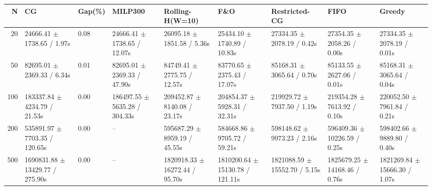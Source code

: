 \begin{tabular}{rllllllll}
\toprule
N & CG & Gap(\%) & MILP300 & Rolling-H(W=10) & F\&O & Restricted-CG & FIFO & Greedy \\
\midrule
20 & 24666.41 $\pm$ 1738.65 / 1.97s & 0.08 & 24666.41 $\pm$ 1738.65 / 12.07s & 26095.18 $\pm$ 1851.58 / 5.36s & 25434.10 $\pm$ 1740.89 / 10.83s & 27334.35 $\pm$ 2078.19 / 0.42s & 27354.35 $\pm$ 2058.26 / 0.00s & 27334.35 $\pm$ 2078.19 / 0.01s \\
50 & 82695.01 $\pm$ 2369.33 / 6.34s & 0.01 & 82695.01 $\pm$ 2369.33 / 47.90s & 84749.41 $\pm$ 2775.75 / 12.57s & 83770.65 $\pm$ 2375.43 / 17.07s & 85168.31 $\pm$ 3065.64 / 0.70s & 85133.55 $\pm$ 2627.06 / 0.01s & 85168.31 $\pm$ 3065.64 / 0.04s \\
100 & 183337.84 $\pm$ 4234.79 / 21.53s & 0.00 & 186497.55 $\pm$ 5635.28 / 304.33s & 209452.87 $\pm$ 8140.08 / 23.17s & 204854.37 $\pm$ 5928.31 / 32.31s & 219929.72 $\pm$ 7937.50 / 1.19s & 219354.28 $\pm$ 7613.92 / 0.10s & 220052.50 $\pm$ 7961.84 / 0.21s \\
200 & 535891.97 $\pm$ 7703.35 / 120.65s & 0.00 & -- & 595687.29 $\pm$ 8959.19 / 45.55s & 584668.86 $\pm$ 9705.72 / 59.21s & 598148.62 $\pm$ 9973.23 / 2.16s & 596409.36 $\pm$ 10226.59 / 0.25s & 598402.66 $\pm$ 9889.80 / 0.40s \\
500 & 1690831.88 $\pm$ 13429.77 / 275.90s & 0.00 & -- & 1820918.33 $\pm$ 16272.44 / 95.70s & 1810200.64 $\pm$ 15130.78 / 121.11s & 1821088.59 $\pm$ 15552.70 / 5.15s & 1825679.25 $\pm$ 14168.46 / 0.76s & 1821269.84 $\pm$ 15666.30 / 1.07s \\
\bottomrule
\end{tabular}
